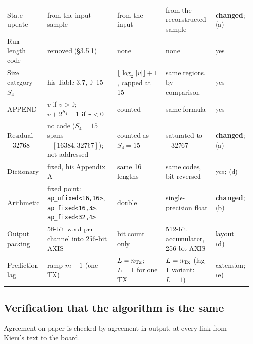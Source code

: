 \begin{table}[p]
\begin{tabular}{@{}>{\raggedright}p{}>{\raggedright}p{}>{\raggedright}p{}>{\raggedright}p{}>{\raggedright\arraybackslash}p{}@{}}
State update & from the input sample & from the input & from the reconstructed sample & \textbf{changed}; (a)\\
Run-length code & removed (\S{}3.5.1) & none & none & yes\\
Size category $S_4$ & his Table 3.7, 0--15 & $\lfloor\log_2|v|\rfloor+1$, capped at 15 & same regions, by comparison & yes\\
APPEND & $v$ if $v>0$; $v + 2^{S_4} - 1$ if $v<0$ & counted & same formula & yes\\
Residual $-32768$ & no code ($S_4 = 15$ spans $\pm[16384, 32767]$); not addressed & counted as $S_4 = 15$ & saturated to $-32767$ & \textbf{changed}; (a)\\
Dictionary & fixed, his Appendix A & same 16 lengths & same codes, bit-reversed & yes; (d)\\
Arithmetic & fixed point: \texttt{ap\_ufixed<16,16>}, \texttt{ap\_fixed<16,3>}, \texttt{ap\_fixed<32,4>} & double & single-precision float & \textbf{changed}; (b)\\
Output packing & 58-bit word per channel into 256-bit AXIS & bit count only & 512-bit accumulator, 256-bit AXIS & layout; (d)\\
Prediction lag & ramp $m-1$ (one TX) & $L = n_{\mathrm{Tx}}$; $L = 1$ for one TX & $L = n_{\mathrm{Tx}}$ (lag-1 variant: $L = 1$) & extension; (e)\\
\bottomrule
\end{tabular}
\end{table}

\subsection{Verification that the algorithm is the same}
\label{sec:kr_crosscheck}

Agreement on paper is checked by agreement in output, at every link from Kiem's
text to the board.

